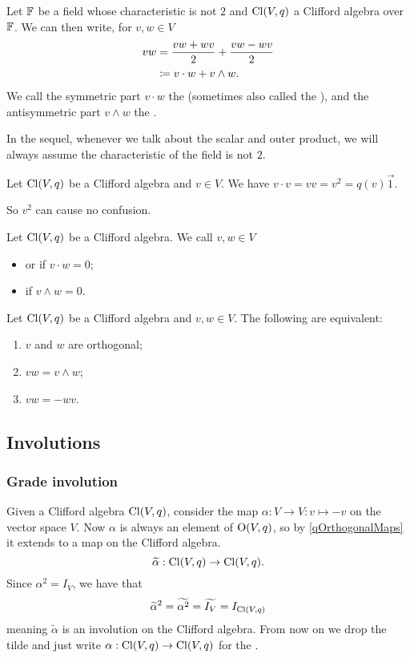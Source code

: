 \begin{definition}
Let $\mathbb{F}$ be a field whose characteristic is not $2$ and $\operatorname{Cl}(V,q)$ a Clifford algebra over $\mathbb{F}$. We can then write, for $v,w\in V$
\begin{align*}
vw &= \frac{vw+wv}{2} + \frac{vw-wv}{2} \\
&\coloneqq v\cdot w + v\wedge w.
\end{align*}
We call the symmetric part $v\cdot w$ the  (sometimes also called the ),
and the antisymmetric part $v\wedge w$ the .
\end{definition}
In the sequel, whenever we talk about the scalar and outer product, we will always assume the characteristic of the field is not $2$.

\begin{lemma}
Let $\operatorname{Cl}(V,q)$ be a Clifford algebra and $v\in V$. We have $v\cdot v = vv = v^2 = q(v)\vec{1}$.
\end{lemma}
So $v^2$ can cause no confusion.

\begin{definition}
Let $\operatorname{Cl}(V,q)$ be a Clifford algebra. We call $v,w\in V$
\begin{itemize}
\item {} or  if $v\cdot w = 0$;
\item {} if $v\wedge w = 0$.
\end{itemize}
\end{definition}
\begin{lemma}
Let $\operatorname{Cl}(V,q)$ be a Clifford algebra and $v,w\in V$. The following are equivalent:
\begin{enumerate}
\item $v$ and $w$ are orthogonal;
\item $vw = v\wedge w$;
\item $vw = -wv$.
\end{enumerate}
\end{lemma}

\subsection{Involutions}
\subsubsection{Grade involution}
Given a Clifford algebra $\operatorname{Cl}(V,q)$, consider the map $\alpha: V \to V: v\mapsto -v$ on the vector space $V$.
Now $\alpha$ is always an element of $\operatorname{O}(V,q)$, so by \ref{qOrthogonalMaps} it extends to a map on the Clifford algebra.
\[ \widetilde{\alpha}: \operatorname{Cl}(V,q) \to \operatorname{Cl}(V,q). \]
Since $\alpha^2 = I_V$, we have that
\[ \widetilde{\alpha}^2 = \widetilde{\alpha^2} = \widetilde{I_V} = I_{\operatorname{Cl}(V,q)} \]
meaning $\widetilde{\alpha}$ is an involution on the Clifford algebra. From now on we drop the tilde and just write $\alpha: \operatorname{Cl}(V,q) \to \operatorname{Cl}(V,q)$ for the .

